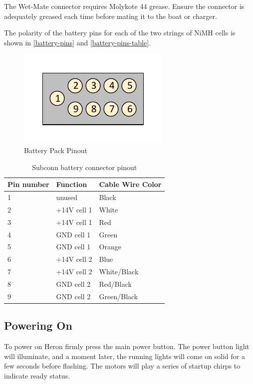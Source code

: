 \documentclass[]{clearpath-latex/clearpath-manual}
\begin{document}
\begin{warning}
The Wet-Mate connector requires Molykote 44 grease. Ensure the connector is adequately greased each time before mating it to the boat or charger.
\end{warning}


The polarity of the battery pins for each of the two strings of NiMH cells is shown in \autoref{battery-pins} and \autoref{battery-pins-table}.

\begin{figure}[h]
  \centering
  \includegraphics[width=0.5\linewidth]{graphics/h-batpin.pdf}
  \caption{Battery Pack Pinout}
  \label{battery-pins}
\end{figure}

\begin{table}[h]
\centering
\label{chg_pinout}
\begin{tabular}{|l|l|l|} 
Pin number  & Function & Cable Wire Color \\
\hline
1  & unused & Black         \\ \hline
2  & +14V cell 1 & White  	\\ \hline
3  & +14V cell 1 & Red		\\ \hline
4  & GND cell 1 & Green     \\ \hline
5  & GND cell 1 & Orange    \\ \hline
6  & +14V cell 2 & Blue     \\ \hline
7  & +14V cell 2 & White/Black	\\ \hline
8  & GND cell 2 & Red/Black		\\ \hline
9  & GND cell 2 & Green/Black	\\ \hline

\end{tabular}
\label{battery-pins-table}
\caption{Subconn battery connector pinout}
\end{table}

\newpage

\subsection{Powering On}
To power on Heron firmly press the main power button. The power button light will illuminate, and a moment later, the running lights will come on solid for a few seconds before flashing. The motors will play a series of startup chirps to indicate ready status.
\end{document}
